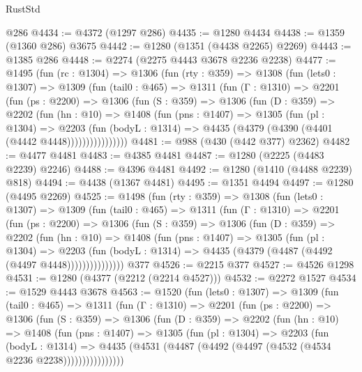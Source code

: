 \begin{lexlean}{RustStd}
\begin{coremodule}
{\begin{coremodule}
{{{{{{{{{{{{    @286
@4434 := @4372 (@1297 @286)
@4435 := @1280 @4434
@4438 := @1359 (@1360 @286) @3675
@4442 := @1280 (@1351 (@4438 @2265) @2269)
@4443 := @1385 @286
@4448 := @2274 (@2275 @4443 @3678 @2236 @2238)
@4477 := @1495
    (fun (rc : @1304) =>
    @1306
      (fun (rty : @359) =>
      @1308
        (fun (lets0 : @1307) =>
        @1309
          (fun (tail0 : @465) =>
          @1311
            (fun (Γ : @1310) =>
            @2201
              (fun (ps : @2200) =>
              @1306
                (fun (S : @359) =>
                @1306
                  (fun (D : @359) =>
                  @2202
                    (fun (hn : @10) =>
                    @1408
                      (fun (pns : @1407) =>
                      @1305
                        (fun (pl : @1304) =>
                        @2203
                          (fun (bodyL : @1314) =>
                          @4435 (@4379 (@4390 (@4401 (@4442 @4448))))))))))))))))
@4481 := @988 (@430 (@442 @377) @2362)
@4482 := @4477 @4481
@4483 := @4385 @4481
@4487 := @1280 (@2225 (@4483 @2239) @2246)
@4488 := @4396 @4481
@4492 := @1280 (@1410 (@4488 @2239) @818)
@4494 := @4438 (@1367 @4481)
@4495 := @1351 @4494
@4497 := @1280 (@4495 @2269)
@4525 := @1498
    (fun (rty : @359) =>
    @1308
      (fun (lets0 : @1307) =>
      @1309
        (fun (tail0 : @465) =>
        @1311
          (fun (Γ : @1310) =>
          @2201
            (fun (ps : @2200) =>
            @1306
              (fun (S : @359) =>
              @1306
                (fun (D : @359) =>
                @2202
                  (fun (hn : @10) =>
                  @1408
                    (fun (pns : @1407) =>
                    @1305
                      (fun (pl : @1304) =>
                      @2203
                        (fun (bodyL : @1314) =>
                        @4435 (@4379 (@4487 (@4492 (@4497 @4448)))))))))))))))
    @377
@4526 := @2215 @377
@4527 := @4526 @1298
@4531 := @1280 (@4377 (@2212 (@2214 @4527)))
@4532 := @2272 @1527
@4534 := @1529 @4443 @3678
@4563 := @1520
    (fun (lets0 : @1307) =>
    @1309
      (fun (tail0 : @465) =>
      @1311
        (fun (Γ : @1310) =>
        @2201
          (fun (ps : @2200) =>
          @1306
            (fun (S : @359) =>
            @1306
              (fun (D : @359) =>
              @2202
                (fun (hn : @10) =>
                @1408
                  (fun (pns : @1407) =>
                  @1305
                    (fun (pl : @1304) =>
                    @2203
                      (fun (bodyL : @1314) =>
                      @4435 (@4531 (@4487 (@4492 (@4497 (@4532 (@4534 @2236 @2238))))))))))))))))
}}}}}}}}}}}}
\end{coremodule}}
\end{coremodule}
\end{lexlean}
